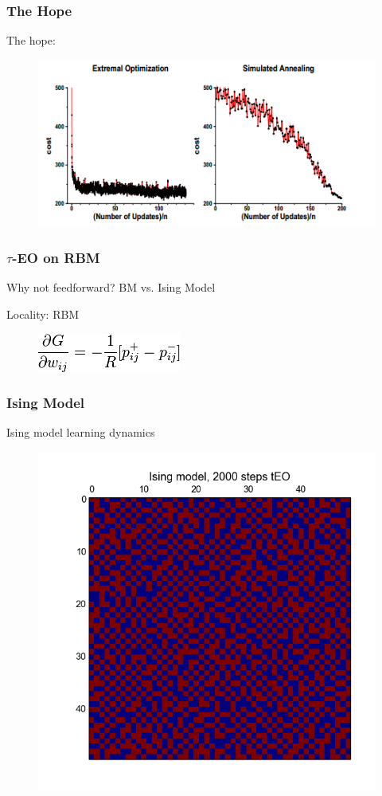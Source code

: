 \documentclass{beamer}
\begin{document}
\begin{frame}
  \frametitle{The Hope}
  The hope:
  \begin{figure}
    \includegraphics{boettcher}
  \end{figure}
\end{frame}

\begin{frame}
  \frametitle{$\tau$-EO on RBM}
  Why not feedforward? BM vs. Ising Model

  Locality: RBM

  \begin{figure}
    \includegraphics{rbm_eq}
  \end{figure}
\end{frame}

\begin{frame}
  \frametitle{Ising Model}
  Ising model learning dynamics
  \begin{figure}
    \includegraphics{2000}
  \end{figure}
\end{frame}
\end{document}
